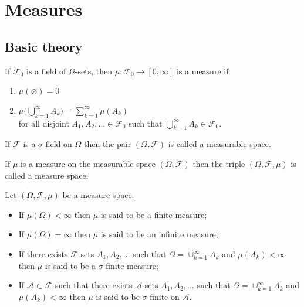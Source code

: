 \clearpage
\section{Measures}

\subsection{Basic theory}





\begin{definition}[{\bf Measure}]
If $\mathcal F_0$ is a field of $\Omega$-sets, then $\mu:\mathcal F_0\rightarrow [0,\infty]$ is a {measure} if
\begin{enumerate}
\item $\mu(\varnothing)=0$
\item $\mu\bigl( \bigcup_{k=1}^\infty A_k \bigr)=\sum_{k=1}^\infty \mu(A_k)$ \\ for all disjoint $A_1, A_2,\ldots \in\mathcal F_0$ such that $\bigcup_{k=1}^\infty A_k \in \mathcal F_0$.
\end{enumerate}
\end{definition}


\begin{definition}
If $\mathcal F$ is a $\sigma$-field on $\Omega$ then the pair $(\Omega, \mathcal F)$  is called a {measurable space}.
\end{definition}


\begin{definition}
If $\mu$ is a measure on the measurable space $(\Omega, \mathcal F)$ then the triple $(\Omega, \mathcal F, \mu)$ is called a {measure space}.
\end{definition}



\begin{definition}
Let $(\Omega, \mathcal F,\mu)$ be a measure space.
\begin{itemize}
\item If $\mu(\Omega)<\infty$ then $\mu$ is said to be a {finite} measure;
\item If $\mu(\Omega)=\infty$ then $\mu$ is said to be an {infinite} measure;
\item If there exists $\mathcal F$-sets $A_1,A_2,\ldots$ such that $\Omega = \cup_{k=1}^\infty A_k$ and $\mu(A_k)<\infty$ then $\mu$ is said to be a {$\sigma$-finite} measure;
\item If $\mathscr A\subset \mathcal F$ such that there exists $\mathscr A$-sets $A_1,A_2,\ldots$ such that $\Omega = \cup_{k=1}^\infty A_k$ and $\mu(A_k)<\infty$ then $\mu$ is said to be {$\sigma$-finite on $\mathscr A$}.
\end{itemize}
\end{definition}

